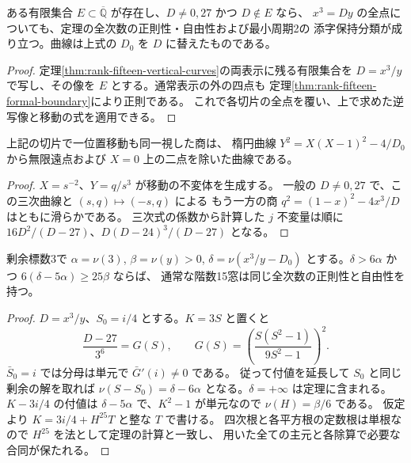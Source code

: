 \begin{corollary}
ある有限集合 $E\subset\overline{\mathbb Q}$ が存在し、$D\ne0,27$ かつ $D\notin E$ なら、
$x^3=Dy$ の全点についても、定理の全次数の正則性・自由性および最小周期2の
添字保持分類が成り立つ。曲線は上式の $D_0$ を $D$ に替えたものである。
\end{corollary}
\begin{proof}
定理\ref{thm:rank-fifteen-vertical-curves}の両表示に残る有限集合を
$D=x^3/y$ で写し、その像を $E$ とする。通常表示の外の四点も
定理\ref{thm:rank-fifteen-formal-boundary}により正則である。
これで各切片の全点を覆い、上で求めた逆写像と移動の式を適用できる。
\end{proof}

\begin{corollary}
上記の切片で一位置移動も同一視した商は、
楕円曲線 $Y^2=X(X-1)^2-4/D_0$ から無限遠点および $X=0$ 上の二点を除いた曲線である。
\end{corollary}
\begin{proof}
$X=s^{-2}$、$Y=q/s^3$ が移動の不変体を生成する。
一般の $D\ne0,27$ で、この三次曲線と $(s,q)\mapsto(-s,q)$ による
もう一方の商 $q^2=(1-x)^2-4x^3/D$ はともに滑らかである。
三次式の係数から計算した $j$ 不変量は順に
$16D^2/(D-27)$、$D(D-24)^3/(D-27)$ となる。
\end{proof}

\begin{corollary}
剰余標数3で $\alpha=\nu(3)$, $\beta=\nu(y)>0$, $\delta=\nu(x^3/y-D_0)$
とする。$\delta>6\alpha$ かつ $6(\delta-5\alpha)\ge25\beta$ ならば、
通常な階数15窓は同じ全次数の正則性と自由性を持つ。
\end{corollary}
\begin{proof}
$D=x^3/y$、$S_0=i/4$ とする。$K=3S$ と置くと
\[
 \frac{D-27}{3^6}=G(S),\qquad G(S)=\left(\frac{S(S^2-1)}{9S^2-1}\right)^2 .
\]
$\bar S_0=i$ では分母は単元で $\bar G'(i)\ne0$ である。
従って付値を延長して $S_0$ と同じ剰余の解を取れば
$\nu(S-S_0)=\delta-6\alpha$ となる。$\delta=+\infty$ は定理に含まれる。
$K-3i/4$ の付値は $\delta-5\alpha$ で、$K^2-1$ が単元なので $\nu(H)=\beta/6$ である。
仮定より $K=3i/4+H^{25}T$ と整な $T$ で書ける。
四次根と各平方根の定数根は単根なので $H^{25}$ を法として定理の計算と一致し、
用いた全ての主元と各除算で必要な合同が保たれる。
\end{proof}
